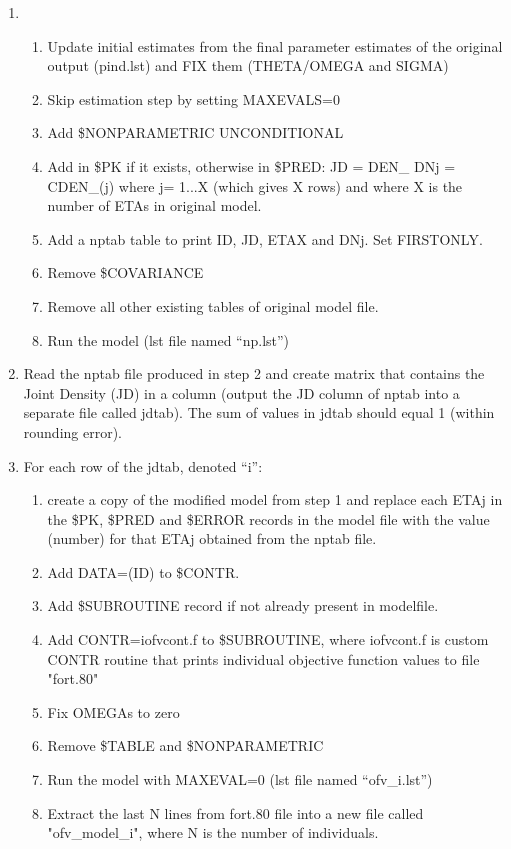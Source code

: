 \begin{enumerate}
\item
	\begin{enumerate}
		\item Update initial estimates from the final parameter estimates of the original output (pind.lst) and FIX them (THETA/OMEGA and SIGMA)
		\item Skip estimation step by setting MAXEVALS=0
		\item Add \$NONPARAMETRIC UNCONDITIONAL
		\item Add in \$PK if it exists, otherwise in \$PRED: 
	JD = DEN\_ 
	DNj = CDEN\_(j) 
	where j= 1...X (which gives X rows) and where X is the number of ETAs in original model.
		\item Add a nptab table to print ID, JD, ETAX and DNj. Set FIRSTONLY.
		\item Remove \$COVARIANCE
		\item Remove all other existing tables of original model file.
		\item Run the model	(lst file named “np.lst”)
	\end{enumerate}
\item Read the nptab file produced in step 2 and create matrix that contains the Joint Density (JD) in a column (output the JD column of nptab into a separate file called jdtab). The sum of values in jdtab should equal 1 (within rounding error).
\item For each row of the jdtab, denoted “i”:
	\begin{enumerate}
		\item create a copy of the modified model from step 1 and replace each ETAj in the \$PK, \$PRED and \$ERROR records in the model file with the value (number) for that ETAj obtained from the nptab file.
		\item Add DATA=(ID) to \$CONTR.
		\item Add \$SUBROUTINE record if not already present in modelfile.
		\item Add CONTR=iofvcont.f to \$SUBROUTINE, where iofvcont.f is custom CONTR 	routine that prints individual objective function values to file "fort.80"
		\item Fix OMEGAs to zero
		\item Remove \$TABLE and \$NONPARAMETRIC
		\item Run the model with MAXEVAL=0 (lst file named “ofv\_i.lst”)
		\item Extract the last N lines from fort.80 file into a new file called "ofv\_model\_i", where N is the number of individuals.

\end{enumerate}
\end{enumerate}

